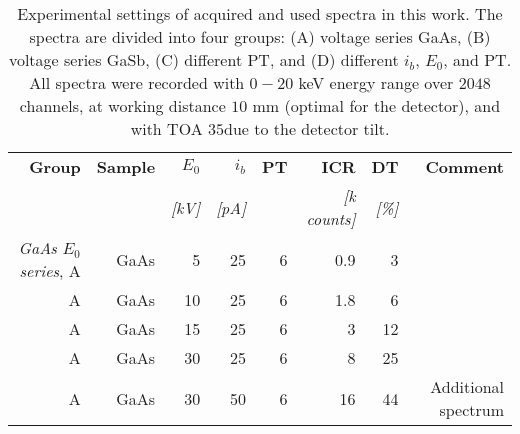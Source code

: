\begin{table}[phtb]
    \begin{center}
        \caption{
            Experimental settings of acquired and used spectra in this work.
            The spectra are divided into four groups: (A) voltage series GaAs, (B) voltage series GaSb, (C) different PT, and (D) different $i_b$, $E_0$, and PT.
            All spectra were recorded with $0-20$ keV energy range over $2048$ channels, at working distance $10$ mm (optimal for the detector), and with TOA $35$\textdegree due to the detector tilt.
        }
        \renewcommand*{\arraystretch}{1.2}
        \label{tab:method:acquisition_settings:all_spectra}
        \begin{tabular}{rrrrrrrr}
            \hline
            \textbf{Group}                        & \textbf{Sample} & \textbf{$E_0$} & \textbf{$i_b$} & \textbf{PT} & \textbf{ICR}      & \textbf{DT} & \textbf{Comment}    \\
                                                  &                 & \emph{[kV]}    & \emph{[pA]}    &             & \emph{[k counts]} & \emph{[\%]} &                     \\
            \hline
            \emph{GaAs $E_0$ series}, A           & GaAs            & 5              & 25             & 6           & 0.9               & 3           &                     \\
            A                                     & GaAs            & 10             & 25             & 6           & 1.8               & 6           &                     \\
            A                                     & GaAs            & 15             & 25             & 6           & 3                 & 12          &                     \\
            A                                     & GaAs            & 30             & 25             & 6           & 8                 & 25          &                     \\
            A                                     & GaAs            & 30             & 50             & 6           & 16                & 44          & Additional spectrum \\
            \hline

\end{tabular}
\end{center}
\end{table}
